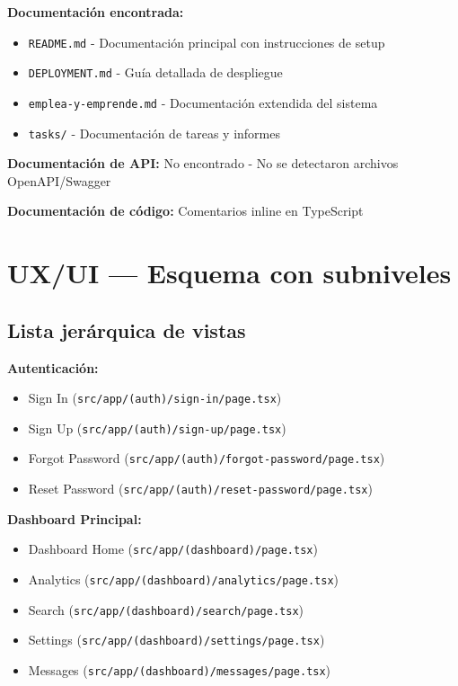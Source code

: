 \documentclass[12pt,a4paper]{article}
\begin{document}
\begin{enumerate}
\textbf{Documentación encontrada:}
\begin{itemize}
    \item \texttt{README.md} - Documentación principal con instrucciones de setup
    \item \texttt{DEPLOYMENT.md} - Guía detallada de despliegue
    \item \texttt{emplea-y-emprende.md} - Documentación extendida del sistema
    \item \texttt{tasks/} - Documentación de tareas y informes
\end{itemize}

\textbf{Documentación de API:} No encontrado - No se detectaron archivos OpenAPI/Swagger

\textbf{Documentación de código:} Comentarios inline en TypeScript

\section{UX/UI — Esquema con subniveles}

\subsection{Lista jerárquica de vistas}

\textbf{Autenticación:}
\begin{itemize}
    \item Sign In (\texttt{src/app/(auth)/sign-in/page.tsx})
    \item Sign Up (\texttt{src/app/(auth)/sign-up/page.tsx})
    \item Forgot Password (\texttt{src/app/(auth)/forgot-password/page.tsx})
    \item Reset Password (\texttt{src/app/(auth)/reset-password/page.tsx})
\end{itemize}

\textbf{Dashboard Principal:}
\begin{itemize}
    \item Dashboard Home (\texttt{src/app/(dashboard)/page.tsx})
    \item Analytics (\texttt{src/app/(dashboard)/analytics/page.tsx})
    \item Search (\texttt{src/app/(dashboard)/search/page.tsx})
    \item Settings (\texttt{src/app/(dashboard)/settings/page.tsx})
    \item Messages (\texttt{src/app/(dashboard)/messages/page.tsx})
\end{itemize}


\end{enumerate}
\end{document}
